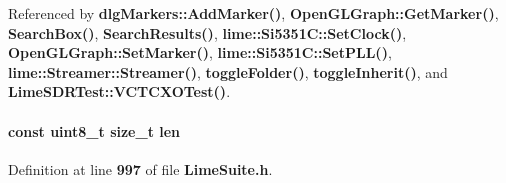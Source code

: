 Referenced by {\bf dlg\+Markers\+::\+Add\+Marker()}, {\bf Open\+G\+L\+Graph\+::\+Get\+Marker()}, {\bf Search\+Box()}, {\bf Search\+Results()}, {\bf lime\+::\+Si5351\+C\+::\+Set\+Clock()}, {\bf Open\+G\+L\+Graph\+::\+Set\+Marker()}, {\bf lime\+::\+Si5351\+C\+::\+Set\+P\+L\+L()}, {\bf lime\+::\+Streamer\+::\+Streamer()}, {\bf toggle\+Folder()}, {\bf toggle\+Inherit()}, and {\bf Lime\+S\+D\+R\+Test\+::\+V\+C\+T\+C\+X\+O\+Test()}.

\paragraph[{len}]{\setlength{\rightskip}{0pt plus 5cm}const uint8\+\_\+t size\+\_\+t len}\label{group__FN__LOW__LVL_gab8d2afc6ea251b08f3a2774565c57d5b}


Definition at line {\bf 997} of file {\bf Lime\+Suite.\+h}.



